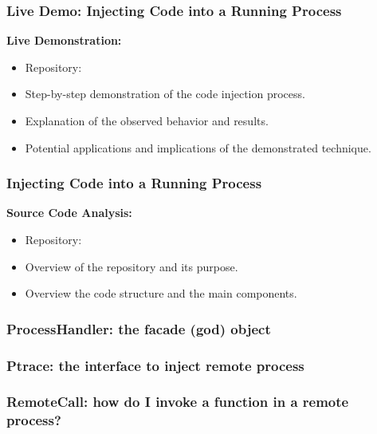 \begin{frame}
    \frametitle{Live Demo: Injecting Code into a Running Process}
    \textbf{Live Demonstration:}
    \begin{itemize}
        \item Repository: \mainrepo
        \item Step-by-step demonstration of the code injection process.
        \item Explanation of the observed behavior and results.
        \item Potential applications and implications of the demonstrated technique.
    \end{itemize}
\end{frame}

\begin{frame}
    \frametitle{Injecting Code into a Running Process}
    \textbf{Source Code Analysis:}
    \begin{itemize}
        \item Repository: \mainrepo
        \item Overview of the repository and its purpose.
        \item Overview the code structure and the main components.
    \end{itemize}
\end{frame}

\begin{frame}
    \frametitle{ProcessHandler: the facade (god) object}
    
\end{frame}

\begin{frame}
    \frametitle{Ptrace: the interface to inject remote process}
    
\end{frame}

\begin{frame}
    \frametitle{RemoteCall: how do I invoke a function in a remote process?}
    
\end{frame}

